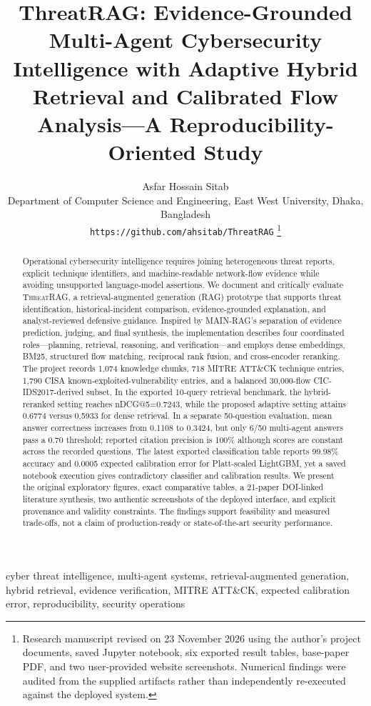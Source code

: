 \documentclass[journal,twoside]{IEEEtran}
\newcommand{\TR}{\textsc{ThreatRAG}}
\begin{document}
\title{ThreatRAG: Evidence-Grounded Multi-Agent Cybersecurity Intelligence with Adaptive Hybrid Retrieval and Calibrated Flow Analysis---A Reproducibility-Oriented Study}
\author{Asfar Hossain Sitab\\Department of Computer Science and Engineering, East West University, Dhaka, Bangladesh\\\texttt{https://github.com/ahsitab/ThreatRAG}%
\thanks{Research manuscript revised on 23 November 2026 using the author's project documents, saved Jupyter notebook, six exported result tables, base-paper PDF, and two user-provided website screenshots. Numerical findings were audited from the supplied artifacts rather than independently re-executed against the deployed system.}}
\maketitle
\begin{abstract}
Operational cybersecurity intelligence requires joining heterogeneous threat reports, explicit technique identifiers, and machine-readable network-flow evidence while avoiding unsupported language-model assertions. We document and critically evaluate \TR, a retrieval-augmented generation (RAG) prototype that supports threat identification, historical-incident comparison, evidence-grounded explanation, and analyst-reviewed defensive guidance. Inspired by MAIN-RAG's separation of evidence prediction, judging, and final synthesis, the implementation describes four coordinated roles---planning, retrieval, reasoning, and verification---and employs dense embeddings, BM25, structured flow matching, reciprocal rank fusion, and cross-encoder reranking. The project records 1,074 knowledge chunks, 718 MITRE ATT\&CK technique entries, 1,790 CISA known-exploited-vulnerability entries, and a balanced 30,000-flow CIC-IDS2017-derived subset. In the exported 10-query retrieval benchmark, the hybrid-reranked setting reaches nDCG@5=0.7243, while the proposed adaptive setting attains 0.6774 versus 0.5933 for dense retrieval. In a separate 50-question evaluation, mean answer correctness increases from 0.1108 to 0.3424, but only 6/50 multi-agent answers pass a 0.70 threshold; reported citation precision is 100\% although scores are constant across the recorded questions. The latest exported classification table reports 99.98\% accuracy and 0.0005 expected calibration error for Platt-scaled LightGBM, yet a saved notebook execution gives contradictory classifier and calibration results. We present the original exploratory figures, exact comparative tables, a 21-paper DOI-linked literature synthesis, two authentic screenshots of the deployed interface, and explicit provenance and validity constraints. The findings support feasibility and measured trade-offs, not a claim of production-ready or state-of-the-art security performance.
\end{abstract}
\begin{IEEEkeywords}
cyber threat intelligence, multi-agent systems, retrieval-augmented generation, hybrid retrieval, evidence verification, MITRE ATT\&CK, expected calibration error, reproducibility, security operations
\end{IEEEkeywords}
\end{document}
